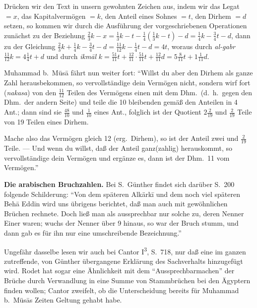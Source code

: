\documentclass[11pt,a4paper]{article}
\newcommand{\enquote}[1]{``#1''}
\begin{document}
Dr\"ucken wir den Text in unsern gewohnten Zeichen aus, indem wir das Legat $= x$, das Kapitalverm\"ogen $= k$, den Anteil eines Sohnes $= t$, den Dirhem $= d$ setzen, so kommen wir durch die Ausf\"uhrung der vorgeschriebenen Operationen zun\"achst zu der Beziehung $\frac{2}{3}k - x = \frac{1}{3}k - t - \frac{1}{4}(\frac{1}{3}k - t) - d = \frac{1}{4}k - \frac{3}{4}t - d$, dann zu der Gleichung $\frac{2}{3}k + \frac{1}{4}k - \frac{3}{4}t - d = \frac{11}{12}k - \frac{1}{4}t - d = 4t$, woraus durch \textit{al-gabr} $\frac{11}{12}k = 4\frac{1}{4}t + d$ und durch \textit{ikm\=al} $k = \frac{51}{11}t + \frac{12}{11} \cdot \frac{51}{11}t + \frac{12}{11}d = 5\frac{8}{11}t + 1\frac{1}{11}d$.

Muhammad b.\ M\"us\=a f\"ahrt nun weiter fort: \enquote{Willst du aber den Dirhem als ganze Zahl herausbekommen, so vervollst\"andige dein Verm\"ogen nicht, sondern wirf fort (\textit{nakasa}) von den $\frac{11}{12}$ Teilen des Verm\"ogens einen mit dem Dhm.\ (d.\ h.\ gegen den Dhm.\ der andern Seite) und teile die 10 bleibenden gem\"a\ss{} den Anteilen in 4 Ant.; dann sind sie $\frac{48}{10}$ und $\frac{1}{10}$ eines Ant., folglich ist der Quotient $2\frac{2}{19}$ und $\frac{2}{19}$ Teile von 19 Teilen eines Dirhem.

Mache also das Verm\"ogen gleich 12 (erg.\ Dirhem), so ist der Anteil zwei und $\frac{2}{19}$ Teile. --- Und wenn du willst, da\ss{} der Anteil ganz(zahlig) herauskommt, so vervollst\"andige dein Verm\"ogen und erg\"anze es, dann ist der Dhm.\ 11 vom Verm\"ogen.}

\textbf{Die arabischen Bruchzahlen.} Bei S.\ G\"unther findet sich dar\"uber S.\ 200 folgende Schilderung: \enquote{Von dem sp\"ateren Alk\"ark\={i} und dem noch viel sp\"ateren Beh\=a{} Edd\={i}n wird uns \"ubrigens berichtet, da\ss{} man auch mit gew\"ohnlichen Br\"uchen rechnete. Doch lie\ss{} man als aussprechbar nur solche zu, deren Nenner Einer waren; wuchs der Nenner \"uber 9 hinaus, so war der Bruch stumm, und dann gab es f\"ur ihn nur eine umschreibende Bezeichnung.}

Ungef\"ahr dasselbe lesen wir auch bei Cantor I\textsuperscript{3}, S.\ 718, nur da\ss{} eine im ganzen zutreffende, von G\"unther \"ubergangene Erkl\"arung des Sachverhalts hinzugef\"ugt wird. Rodet hat sogar eine \"Ahnlichkeit mit dem \enquote{Aussprechbarmachen} der Br\"uche durch Verwandlung in eine Summe von Stammbr\"uchen bei den \"Agyptern finden wollen; Cantor zweifelt, ob die Unterscheidung bereits f\"ur Muhammad b.\ M\"us\=as Zeiten Geltung gehabt habe.
\end{document}
